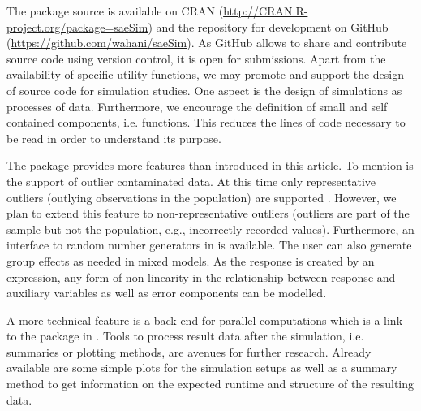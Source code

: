 \documentclass[article]{ajs}
\newcommand{\red}[1]{\color{red} #1 \color{black} }
\begin{document}
The package source is available on CRAN (\url{http://CRAN.R-project.org/package=saeSim}) and the repository for development on GitHub (\url{https://github.com/wahani/saeSim}). As GitHub allows to share and contribute source code using version control, it is open for submissions. Apart from the availability of specific utility functions, we may promote and support the design of source code for simulation studies. One aspect is the design of simulations as processes of data. Furthermore, we encourage the definition of small and self contained components, i.e. functions. This reduces the lines of code necessary to be read in order to understand its purpose. 

The package provides more features than introduced in this article. To mention is the support of outlier contaminated data. At this time only representative outliers (outlying observations in the population) are supported \citep[cf.][]{Cha86}. \red{However, we plan to extend this feature to non-representative outliers (outliers are part of the sample but not the population, e.g., incorrectly recorded values). Furthermore, an interface to random number generators in \proglang{R} is available.} The user can also generate group effects as needed in mixed models. As the response is created by an  expression, any form of non-linearity in the relationship between response and auxiliary variables as well as error components can be modelled.

A more technical feature is a back-end for parallel computations which is a link to the  package in  \citep{r14}. Tools to process result data after the simulation, i.e. summaries or plotting methods, are avenues for further research. Already available are some simple plots for the simulation setups as well as a summary method to get information on the expected runtime and structure of the resulting data.

%

\end{document}
